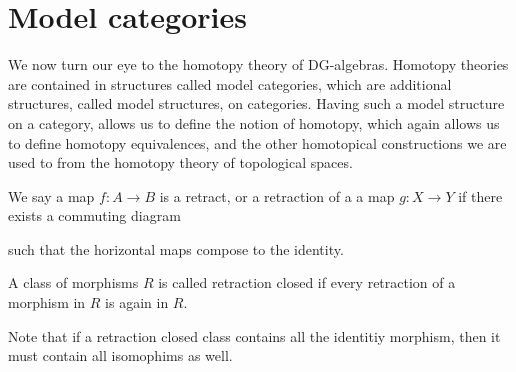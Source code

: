 
\section{Model categories}

We now turn our eye to the homotopy theory of DG-algebras. Homotopy theories are contained in structures called model categories, which are additional structures, called model structures, on categories. Having such a model structure on a category, allows us to define the notion of homotopy, which again allows us to define homotopy equivalences, and the other homotopical constructions we are used to from the homotopy theory of topological spaces. 

\begin{definition}[Retraction]
    We say a map $f:A\longrightarrow B$ is a retract, or a retraction of a a map $g:X\longrightarrow Y$ if there exists a commuting diagram 
\begin{center}
\end{center}
such that the horizontal maps compose to the identity. 
\end{definition}

\begin{definition}
A class of morphisms $R$ is called retraction closed if every retraction of a morphism in $R$ is again in $R$. 
\end{definition}

Note that if a retraction closed class contains all the identitiy morphism, then it must contain all isomophims as well. 



